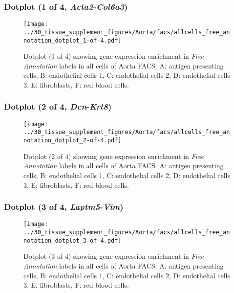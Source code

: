 \clearpage

\subsubsection{Dotplot (1 of 4, \emph{Acta2}-\emph{Col6a3})}
\begin{figure}[h]
\centering
\texttt{[image: ../30\_tissue\_supplement\_figures/Aorta/facs/allcells\_free\_annotation\_dotplot\_1-of-4.pdf]}

\caption{ Dotplot (1 of 4)  showing gene expression enrichment in \emph{Free Annotation} labels in all cells of Aorta FACS. A: antigen presenting cells, B: endothelial cells 1, C: endothelial cells 2, D: endothelial cells 3, E: fibroblasts, F: red blood cells.}
\end{figure}


\clearpage

\subsubsection{Dotplot (2 of 4, \emph{Dcn}-\emph{Krt8})}
\begin{figure}[h]
\centering
\texttt{[image: ../30\_tissue\_supplement\_figures/Aorta/facs/allcells\_free\_annotation\_dotplot\_2-of-4.pdf]}

\caption{ Dotplot (2 of 4)  showing gene expression enrichment in \emph{Free Annotation} labels in all cells of Aorta FACS. A: antigen presenting cells, B: endothelial cells 1, C: endothelial cells 2, D: endothelial cells 3, E: fibroblasts, F: red blood cells.}
\end{figure}


\clearpage

\subsubsection{Dotplot (3 of 4, \emph{Laptm5}-\emph{Vim})}
\begin{figure}[h]
\centering
\texttt{[image: ../30\_tissue\_supplement\_figures/Aorta/facs/allcells\_free\_annotation\_dotplot\_3-of-4.pdf]}

\caption{ Dotplot (3 of 4)  showing gene expression enrichment in \emph{Free Annotation} labels in all cells of Aorta FACS. A: antigen presenting cells, B: endothelial cells 1, C: endothelial cells 2, D: endothelial cells 3, E: fibroblasts, F: red blood cells.}
\end{figure}


